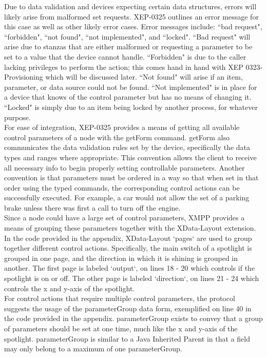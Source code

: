 Due to data validation and devices expecting certain data structures, errors will likely arise from malformed set requests. XEP-0325 outlines an error message for this case as well as other likely error cases. Error messages include:  ``bad request",  ``forbidden",  ``not found",  ``not implemented", and  ``locked".  ``Bad request" will arise due to stanzas that are either malformed or requesting a parameter to be set to a value that the device cannot handle.  ``Forbidden" is due to the caller lacking privileges to perform the action; this comes hand in hand with XEP 0323- Provisioning which will be discussed later.  ``Not found" will arise if an item, parameter, or data source could not be found.  ``Not implemented" is in place for a device that knows of the control parameter but has no means of changing it.  ``Locked" is simply due to an item being locked by another process, for whatever purpose.\\
For ease of integration, XEP-0325 provides a means of getting all available control parameters of a node with the getForm command. getForm also communicates the data validation rules set by the device, specifically the data types and ranges where appropriate. This convention allows the client to receive all necessary info to begin properly setting controllable parameters. Another convention is that parameters must be ordered in a way so that when set in that order using the typed commands, the corresponding control actions can be successfully executed. For example, a car would not allow the set of a parking brake unless there was first a call to turn off the engine. \\
Since a node could have a large set of control parameters, XMPP provides a means of grouping these parameters together with the XData-Layout extension. In the code provided in the appendix, XData-Layout `pages` are used to group together different control actions. Specifically, the main switch of a spotlight is grouped in one page, and the direction in which it is shining is grouped in another. The first page is labeled `output`, on lines 18 - 20 which controls if the spotlight is on or off. The other page is labeled `direction`, on lines 21 - 24 which controls the x and y-axis of the spotlight.\\
For control actions that require multiple control parameters, the protocol suggests the usage of the parameterGroup data form, exemplified on line 40 in the code provided in the appendix. parameterGroup exists to convey that a group of parameters should be set at one time, much like the x and y-axis of the spotlight. parameterGroup is similar to a Java Inherited Parent in that a field may only belong to a maximum of one parameterGroup. \\

